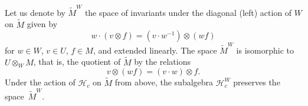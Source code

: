 \documentclass[12pt]{amsart}
\newcommand{\C}{\mathbb C}
\newcommand{\cH}{\mathcal{H}}
\numberwithin{equation}{section}
\theoremstyle{definition}
\newtheorem{remark}[theorem]{Remark}
\begin{document}
Let us denote by $\widetilde{M}^W$ the space of invariants under the diagonal (left) action of $W$ on $\widetilde{M}$ given by 
\begin{equation}\label{diag action}
    w \cdot (v \otimes f) = (v \cdot w^{-1}) \otimes (w f)
\end{equation}
for $w \in W$, $v \in U$, $f \in M$, and extended linearly. 
The space $\widetilde{M}^W$ is isomorphic to~$U \otimes_W M$, that is, the quotient of $\widetilde{M}$ by the relations
\begin{equation*}
    v \otimes (w f) =  (v \cdot w) \otimes f. 
\end{equation*}
Under the action of $\cH_c$ on $\widetilde{M}$ from above, the subalgebra $\cH_c^W$ preserves the space~$\widetilde{M}^W$.


\end{document}
